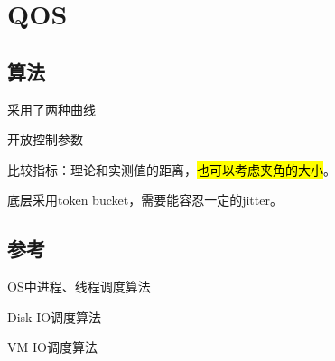 \section{QOS}

\subsection{算法}

采用了两种曲线

开放控制参数

比较指标：理论和实测值的距离，\hl{也可以考虑夹角的大小}。 

底层采用token bucket，需要能容忍一定的jitter。

\subsection{参考}

\begin{enumbox}
\item OS中进程、线程调度算法
\item Disk IO调度算法
\item VM IO调度算法
\end{enumbox}

